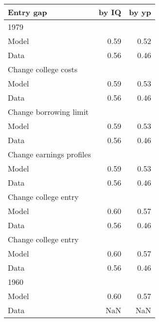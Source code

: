 \begin{tabular}{lrr}
\hline
Entry gap & by IQ  & by yp  \\ 
\hline
1979 &   &   \\ 
Model & 0.59  & 0.52  \\ 
Data & 0.56  & 0.46  \\ 
Change college costs &   &   \\ 
Model & 0.59  & 0.53  \\ 
Data & 0.56  & 0.46  \\ 
Change borrowing limit &   &   \\ 
Model & 0.59  & 0.53  \\ 
Data & 0.56  & 0.46  \\ 
Change earnings profiles &   &   \\ 
Model & 0.59  & 0.53  \\ 
Data & 0.56  & 0.46  \\ 
Change college entry &   &   \\ 
Model & 0.60  & 0.57  \\ 
Data & 0.56  & 0.46  \\ 
Change college entry &   &   \\ 
Model & 0.60  & 0.57  \\ 
Data & 0.56  & 0.46  \\ 
1960 &   &   \\ 
Model & 0.60  & 0.57  \\ 
Data & NaN  & NaN  \\ 
\hline
\end{tabular}%
